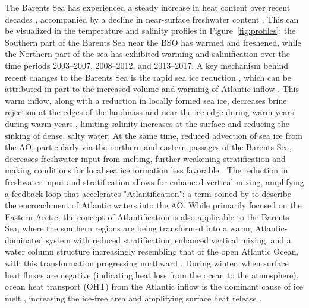 \documentclass[draft]{agujournal2019}
\begin{document}
The Barents Sea has experienced a steady increase in heat content over recent decades \cite{Smedsrud2013,Bianco2024}, accompanied by a decline in near-surface freshwater content \cite{Watelet2020}. This can be visualized in the temperature and salinity profiles in Figure~\ref{fig:profiles}: the Southern part of the Barents Sea near the BSO has warmed and freshened, while the Northern part of the sea has exhibited warming and salinification over the time periods 2003--2007, 2008--2012, and 2013--2017. A key mechanism behind recent changes to the Barents Sea is the rapid sea ice reduction \cite{Rieke2023}, which can be attributed in part to the increased volume and warming of Atlantic inflow \cite{Smedsrud2010,Onarheim2018,Smedsrud2022}. This warm inflow, along with a reduction in locally formed sea ice, decreases brine rejection at the edges of the landmass and near the ice edge during warm years during warm years \cite{arthun2011}, limiting salinity increases at the surface and reducing the sinking of dense, salty water. At the same time, reduced advection of sea ice from the AO, particularly via the northern and eastern passages of the Barents Sea, decreases freshwater input from melting, further weakening stratification and making conditions for local sea ice formation less favorable \cite{Lind2018,Lundesgaard2022,Efstathiou2022}. The reduction in freshwater input and stratification allows for enhanced vertical mixing, amplifying a feedback loop that accelerates "Atlantification": a term coined by  to describe the encroachment of Atlantic waters into the AO. While  primarily focused on the Eastern Arctic, the concept of Atlantification is also applicable to the Barents Sea, where the southern regions are being transformed into a warm, Atlantic-dominated system with reduced stratification, enhanced vertical mixing, and a water column structure increasingly resembling that of the open Atlantic Ocean, with this transformation progressing northward \cite{Arthun2012,Gerland2023}. During winter, when surface heat fluxes are negative (indicating heat loss from the ocean to the atmosphere), ocean heat transport (OHT) from the Atlantic inflow is the dominant cause of ice melt \cite{Ivanov2012,Tsubouchi2021}, increasing the ice-free area and amplifying surface heat release \cite{Skagseth2020}. 

\end{document}
